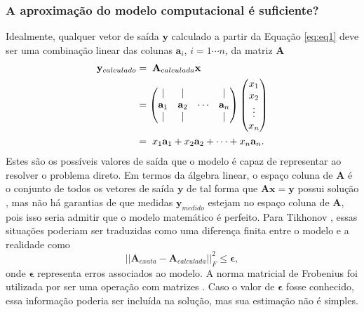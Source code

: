 \subsubsection{A aproximação do modelo computacional é suficiente?}
Idealmente, qualquer vetor de saída $\mathbf{y}$ calculado a partir da Equação \eqref{eq:eq1} deve ser uma combinação linear das colunas $\mathbf{a}_i$, $i = 1\cdots n$, da matriz $\mathbf{A}$
\begin{equation}
\begin{aligned}
\mathbf{y}_{calculado} & = \hspace{1mm}\mathbf{A}_{calculada} \mathbf{x} \\
& =  \begin{pmatrix}
\vert & \vert & & \vert\\
\mathbf{a}_1 & \mathbf{a}_2 & \cdots & \mathbf{a}_n\\
\vert & \vert & & \vert\\
\end{pmatrix} 
\begin{pmatrix}
x_1 \\
x_2 \\
\vdots\\
x_n \\
\end{pmatrix} \\
& =  \hspace{1mm} x_1 \mathbf{a}_1 + x_2 \mathbf{a}_2 + \cdots + x_n \mathbf{a}_n.
\label{eq:eq2}
\end{aligned}
\end{equation}
Estes são os possíveis valores de saída que o modelo é capaz de representar ao resolver o problema direto. Em termos da álgebra linear, o espaço coluna de $\mathbf{A}$ é o conjunto de todos os vetores de saída $\mathbf{y}$ de tal forma que $\mathbf{A} \mathbf{x} = \mathbf{y}$ possui solução \cite[pág. 64-5]{golub2013matrix}, mas não há garantias de que medidas $\mathbf{y}_{medido}$ estejam no espaço coluna de $\mathbf{A}$, pois isso seria admitir que o modelo matemático é perfeito. Para Tikhonov \cite[pág. 6]{tikhonov1977solutions}, essas situações poderiam ser traduzidas como uma diferença finita entre o modelo e a realidade como
\begin{equation}
\vert \vert \mathbf{A}_{exata} - \mathbf{A}_{calculada} \vert \vert^2_F \leq \bm{\epsilon},
\label{eq:sistema2}
\end{equation}
onde $\bm{\epsilon}$ representa erros associados ao modelo. A norma matricial de Frobenius foi utilizada por ser uma operação com matrizes \cite[pág. 71]{golub2013matrix}. Caso o valor de $\bm{\epsilon}$ fosse conhecido, essa informação poderia ser incluída na solução, mas sua estimação não é simples.

